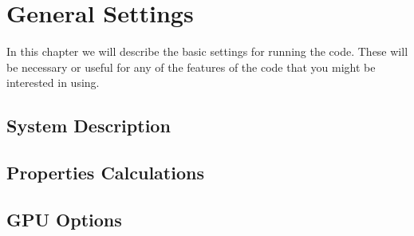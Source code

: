 \chapter{General Settings}

In this chapter we will describe the basic settings for running the code.
These will be necessary or useful for any of the features of the code
that you might be interested in using.

\section{System Description}



\section{Properties Calculations}



\section{GPU Options}


